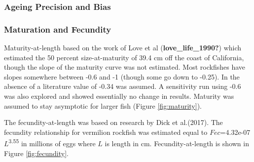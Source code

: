 \documentclass[11pt,
  english,
  a4paper,
]{article}
\begin{document}
\hypertarget{ageing-precision-and-bias}{%
\subsubsection{Ageing Precision and Bias}\label{ageing-precision-and-bias}}

\leavevmode\tagmcend\tagstructend


\hypertarget{maturation-and-fecundity}{%
\subsubsection{Maturation and Fecundity}\label{maturation-and-fecundity}}

\leavevmode\tagmcend\tagstructend


Maturity-at-length based on the work of Love et al {(\textbf{love\_life\_1990?})\leavevmode\tagmcend\tagstructend} which estimated the 50 percent size-at-maturity of 39.4 cm off the coast of California, though the slope of the maturity curve was not estimated. Most rockfishes have slopes somewhere between -0.6 and -1 (though some go down to -0.25). In the absence of a literature value of -0.34 was assumed. A sensitivity run using -0.6 was also explored and showed essentially no change in results. Maturity was assumed to stay asymptotic for larger fish (Figure \ref{fig:maturity}).

\leavevmode\tagmcend\tagstructend\par


The fecundity-at-length was based on research by Dick et al.{(2017)\leavevmode\tagmcend\tagstructend}. The fecundity relationship for vermilion rockfish was estimated equal to {\(Fec\)\leavevmode\tagmcend\tagstructend}=4.32e-07{\(L\)\leavevmode\tagmcend\tagstructend}\textsuperscript{3.55} in millions of eggs where {\(L\)\leavevmode\tagmcend\tagstructend} is length in cm. Fecundity-at-length is shown in Figure \ref{fig:fecundity}.

\leavevmode\tagmcend\tagstructend\par
\end{document}
